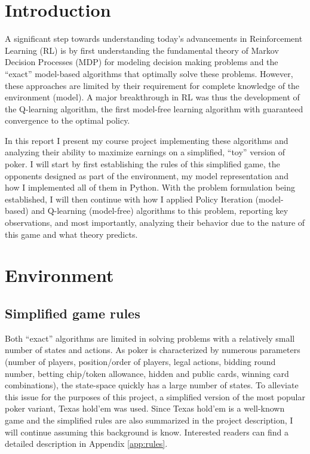 \section{Introduction}

A significant step towards understanding today's advancements in Reinforcement Learning (RL) is by first understanding the fundamental theory of Markov Decision Processes (MDP) for modeling decision making problems and the ``exact'' model-based algorithms that optimally solve these problems. However, these approaches are limited by their requirement for complete knowledge of the environment (model). A major breakthrough in RL was thus the development of the Q-learning algorithm, the first model-free learning algorithm with guaranteed convergence to the optimal policy.

In this report I present my course project implementing these algorithms and analyzing their ability to maximize earnings on a simplified, ``toy'' version of poker. I will start by first establishing the rules of this simplified game, the opponents designed as part of the environment, my model representation and how I implemented all of them in Python. With the problem formulation being established, I will then continue with how I applied Policy Iteration (model-based) and Q-learning (model-free) algorithms to this problem, reporting key observations, and most importantly, analyzing their behavior due to the nature of this game and what theory predicts.

\section{Environment}

\subsection{Simplified game rules}

Both ``exact'' algorithms are limited in solving problems with a relatively small number of states and actions. As poker is characterized by numerous parameters (number of players, position/order of players, legal actions, bidding round number, betting chip/token allowance, hidden and public cards, winning card combinations), the state-space quickly has a large number of states. To alleviate this issue for the purposes of this project, a simplified version of the most popular poker variant, Texas hold'em was used. Since Texas hold'em is a well-known game and the simplified rules are also summarized in the project description, I will continue assuming this background is know. Interested readers can find a detailed description in Appendix \ref{app:rules}.

